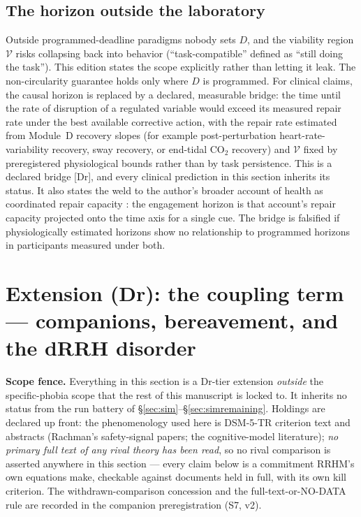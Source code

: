\documentclass[9pt,twocolumn]{article}
\newcommand{\tier}[1]{{\sffamily\scriptsize\color{RRHMSlate}[#1]}}
\newcommand{\Vset}{\mathcal{V}}
\begin{document}
\subsection{The horizon outside the laboratory}
Outside programmed-deadline paradigms nobody sets $D$, and the viability region $\Vset$ risks collapsing back into behavior (``task-compatible'' defined as ``still doing the task''). This edition states the scope explicitly rather than letting it leak. The non-circularity guarantee holds only where $D$ is programmed. For clinical claims, the causal horizon is replaced by a declared, measurable bridge: the time until the rate of disruption of a regulated variable would exceed its measured repair rate under the best available corrective action, with the repair rate estimated from Module~D recovery slopes (for example post-perturbation heart-rate-variability recovery, sway recovery, or end-tidal CO$_2$ recovery) and $\Vset$ fixed by preregistered physiological bounds rather than by task persistence. This is a declared bridge \tier{Dr}, and every clinical prediction in this section inherits its status. It also states the weld to the author's broader account of health as coordinated repair capacity \cite{lahtee2026srct}: the engagement horizon is that account's repair capacity projected onto the time axis for a single cue. The bridge is falsified if physiologically estimated horizons show no relationship to programmed horizons in participants measured under both.

\section{Extension (Dr): the coupling term --- companions, bereavement, and the dRRH disorder}
\label{sec:coupling}
\textbf{Scope fence.} Everything in this section is a Dr-tier extension \emph{outside} the specific-phobia scope that the rest of this manuscript is locked to. It inherits no status from the run battery of \S\ref{sec:sim}--\S\ref{sec:simremaining}. Holdings are declared up front: the phenomenology used here is DSM-5-TR criterion text and abstracts (Rachman's safety-signal papers; the cognitive-model literature); \emph{no primary full text of any rival theory has been read}, so no rival comparison is asserted anywhere in this section --- every claim below is a commitment RRHM's own equations make, checkable against documents held in full, with its own kill criterion. The withdrawn-comparison concession and the full-text-or-NO-DATA rule are recorded in the companion preregistration (S7, v2).
\end{document}
